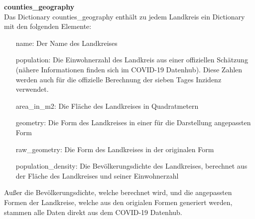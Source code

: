 \textbf{counties\_geography}\\
Das Dictionary counties\_geography enthält zu jedem Landkreis ein Dictionary mit den folgenden Elemente:
\begin{itemize}
    \item[name:] Der Name des Landkreises
    \item[population:] Die Einwohnerzahl des Landkreis aus einer offiziellen Schätzung (nähere Informationen finden sich im COVID-19 Datenhub). Diese Zahlen werden auch für die offizielle Berechnung der sieben Tages Inzidenz verwendet.
    \item[area\_in\_m2:] Die Fläche des Landkreises in Quadratmetern
    \item[geometry:] Die Form des Landkreises in einer für die Darstellung angepassten Form
    \item[raw\_geometry:] Die Form des Landkreises in der originalen Form
    \item[population\_density:] Die Bevölkerungsdichte des Landkreises, berechnet aus der Fläche des Landkreises und seiner Einwohnerzahl
\end{itemize}
Außer die Bevölkerungsdichte, welche berechnet wird, und die angepassten Formen der Landkreise, welche aus den origialen Formen generiert werden, stammen alle Daten direkt aus dem \glqq{}COVID-19 Datenhub\grqq{}.

